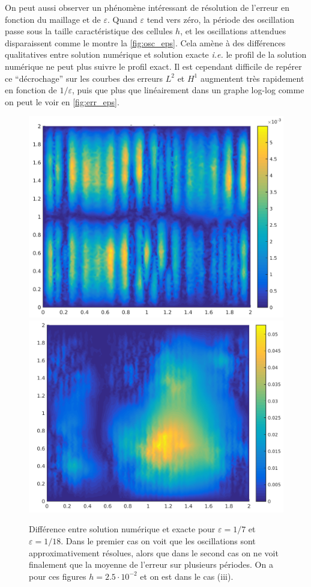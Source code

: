 \documentclass[11pt]{article}
\newcommand{\ie}{\emph{i.e.} }
\begin{document}
On peut aussi observer un phénomène intéressant de résolution de l'erreur en fonction du maillage et de $\varepsilon$. Quand $\varepsilon$ tend vers
zéro, la période des oscillation passe sous la taille caractéristique des cellules $h$, et les oscillations attendues disparaissent comme le montre la
\autoref{fig:osc_eps}. Cela amène à des différences qualitatives entre solution numérique et solution exacte \ie le profil de la solution numérique
ne peut plus suivre le profil exact. Il est cependant difficile de repérer ce ``décrochage'' sur les courbes des erreurs $L^2$ et $H^1$ augmentent
très rapidement en fonction de $1/\varepsilon$, puis que plus que linéairement dans un graphe log-log comme on peut le voir en
\autoref{fig:err_eps}.   
\begin{figure}
  \centering
  \includegraphics[height=.25\textheight]{SolutionExacte/limit_res_eps7} 
  \includegraphics[height=.25\textheight]{SolutionExacte/non_res_eps18}   
  \caption{Différence entre solution numérique et exacte pour $\varepsilon=1/7$ et $\varepsilon=1/18$. Dans le premier cas on voit que les
    oscillations sont approximativement résolues, alors que dans le second cas on ne voit finalement que la moyenne de l'erreur sur plusieurs
    périodes. On a pour ces figures $h=2.5\cdot10^{-2}$ et on est dans le cas (iii).}
  \label{fig:osc_eps}
\end{figure}
\end{document}
